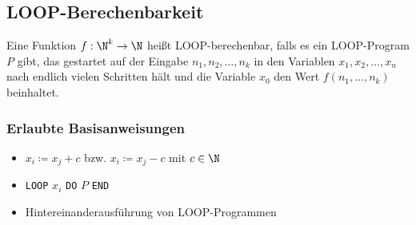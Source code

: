 %
%
%
%
%
%




\subsection{LOOP-Berechenbarkeit}\label{sec:loop}
Eine Funktion $f:\N^k\rightarrow \N$ heißt LOOP-berechenbar,  falls es ein LOOP-Program $P$ gibt, das gestartet auf der Eingabe $n_1,n_2,\ldots,n_k$ in den Variablen $x_1,x_2,\ldots,x_n$ nach endlich vielen Schritten hält und die Variable $x_0$ den Wert $f(n_1,\ldots,n_k)$ beinhaltet.
\subsubsection{Erlaubte Basisanweisungen}
\begin{itemize}
	\item $x_i\coloneqq x_j+c$ bzw. $x_i\coloneqq x_j-c$ mit $c\in\N$
	\item \texttt{LOOP} $x_i$ \texttt{DO} $P$ \texttt{END}
	\item Hintereinanderausführung von LOOP-Programmen
\end{itemize}
